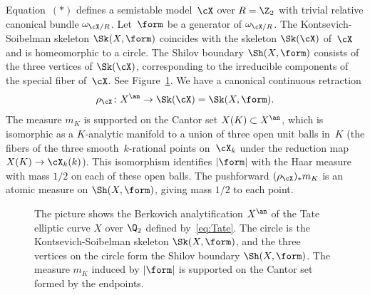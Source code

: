 Equation~$(*)$ defines a semistable model~$\cX$ over $R=\Z_2$ with trivial relative canonical bundle $\omega_{\cX/R}$. Let~$\form$ be a generator of
$\omega_{\cX/R}$.
The Kontsevich-Soibelman skeleton $\Sk(X,\form)$ coincides with the skeleton $\Sk(\cX)$ of~$\cX$ and is homeomorphic to a circle. The Shilov boundary $\Sh(X,\form)$ consists of the three vertices of $\Sk(\cX)$,
corresponding to the irreducible components of the special fiber of~$\cX$. See Figure~\ref{F101}. We have a canonical continuous retraction
\[
\rho_{\cX}\colon X^{\an}\to \Sk(\cX)=\Sk(X,\form).
\]
The measure $m_K$ is supported on the Cantor set $X(K)\subset X^{\an}$, which is isomorphic as a $K$\nobreakdash-analytic manifold to a union of three open unit balls in~$K$ (the fibers of the three smooth~$k$-rational points on~$\cX_k$ under the reduction map $X(K)\to \cX_k(k)$). This isomorphism identifies $|\form|$ with the Haar measure with mass $1/2$ on each of these open balls.
The pushforward $(\rho_{\cX})_*m_K$ is an atomic measure on $\Sh(X,\form)$, giving mass $1/2$ to each point.
\begin{figure}[ht]
\centering
{}
\caption{\smaller The picture shows the Berkovich analytification $X^{\an}$ of the Tate elliptic curve $X$ over $\Q_2$ defined by~\eqref{eq:Tate}. The circle is the Kontsevich-Soibelman skeleton $\Sk(X,\form)$, and the three vertices on the circle form the Shilov boundary $\Sh(X,\form)$. The measure $m_K$ induced by $|\form|$ is supported on the Cantor set formed by the endpoints.}\label{F101}
\end{figure}


